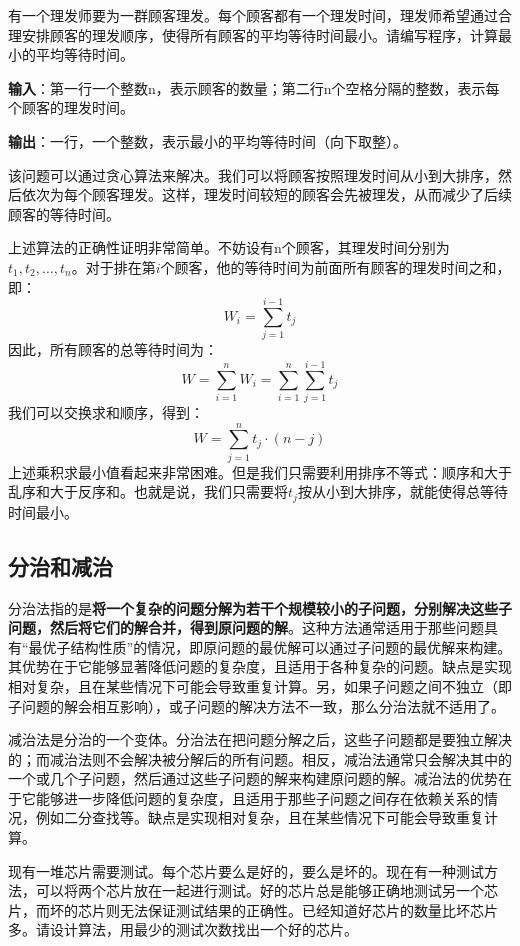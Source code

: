 \begin{example}
    有一个理发师要为一群顾客理发。每个顾客都有一个理发时间，理发师希望通过合理安排顾客的理发顺序，使得所有顾客的平均等待时间最小。请编写程序，计算最小的平均等待时间。

    \textbf{输入}：第一行一个整数n，表示顾客的数量；第二行n个空格分隔的整数，表示每个顾客的理发时间。

    \textbf{输出}：一行，一个整数，表示最小的平均等待时间（向下取整）。
\end{example}

\begin{answer}
    该问题可以通过贪心算法来解决。我们可以将顾客按照理发时间从小到大排序，然后依次为每个顾客理发。这样，理发时间较短的顾客会先被理发，从而减少了后续顾客的等待时间。

    上述算法的正确性证明非常简单。不妨设有n个顾客，其理发时间分别为$t_1,t_2,\dots,t_n$。对于排在第$i$个顾客，他的等待时间为前面所有顾客的理发时间之和，即：
    $$W_i = \sum_{j=1}^{i-1} t_j$$
    因此，所有顾客的总等待时间为：
    $$W = \sum_{i=1}^{n} W_i = \sum_{i=1}^{n} \sum_{j=1}^{i-1} t_j$$
    我们可以交换求和顺序，得到：
    $$W = \sum_{j=1}^{n} t_j \cdot (n - j)$$
    上述乘积求最小值看起来非常困难。但是我们只需要利用排序不等式：顺序和大于乱序和大于反序和。也就是说，我们只需要将$t_j$按从小到大排序，就能使得总等待时间最小。
\end{answer}

\subsection{分治和减治}

分治法指的是\textbf{将一个复杂的问题分解为若干个规模较小的子问题，分别解决这些子问题，然后将它们的解合并，得到原问题的解}。这种方法通常适用于那些问题具有“最优子结构性质”的情况，即原问题的最优解可以通过子问题的最优解来构建。其优势在于它能够显著降低问题的复杂度，且适用于各种复杂的问题。缺点是实现相对复杂，且在某些情况下可能会导致重复计算。另，如果子问题之间不独立（即子问题的解会相互影响），或子问题的解决方法不一致，那么分治法就不适用了。

减治法是分治的一个变体。分治法在把问题分解之后，这些子问题都是要独立解决的；而减治法则不会解决被分解后的所有问题。相反，减治法通常只会解决其中的一个或几个子问题，然后通过这些子问题的解来构建原问题的解。减治法的优势在于它能够进一步降低问题的复杂度，且适用于那些子问题之间存在依赖关系的情况，例如二分查找等。缺点是实现相对复杂，且在某些情况下可能会导致重复计算。

\begin{example}
    现有一堆芯片需要测试。每个芯片要么是好的，要么是坏的。现在有一种测试方法，可以将两个芯片放在一起进行测试。好的芯片总是能够正确地测试另一个芯片，而坏的芯片则无法保证测试结果的正确性。已经知道好芯片的数量比坏芯片多。请设计算法，用最少的测试次数找出一个好的芯片。
\end{example}

